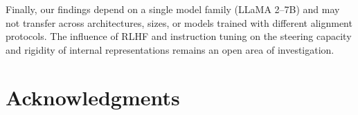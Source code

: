 \documentclass[11pt]{article}
\begin{document}
Finally, our findings depend on a single model family (LLaMA 2–7B) and may not transfer across architectures, sizes, or models trained with different alignment protocols. The influence of RLHF and instruction tuning on the steering capacity and rigidity of internal representations remains an open area of investigation.

\section*{Acknowledgments}


%


\appendix
\end{document}
